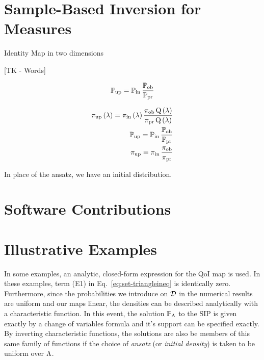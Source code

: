 \pagebreak
\section{Sample-Based Inversion for Measures}\label{sec:ch02-sample}




Identity Map in two dimensions


[TK - Words]

\begin{equation}
\operatorname*{\mathbb{P}_{up}} = \operatorname*{\mathbb{P}_{in}} \frac{\operatorname*{\mathbb{P}_{ob}}}{\operatorname*{\mathbb{P}_{pr}}}
\end{equation}

\begin{equation}
\begin{split}
\operatorname*{\operatorname*{\pi_{up}}\left ( \lambda \right ) = \operatorname*{\pi_{in}}\left ( \lambda \right ) \frac{\operatorname*{\pi_{ob}}Q\left ( \lambda \right )}{\operatorname*{\pi_{pr}}Q\left ( \lambda \right )}}\\
\operatorname*{\operatorname*{\mathbb{P}_{up}} = \operatorname*{\mathbb{P}_{in}} \frac{\operatorname*{\mathbb{P}_{ob}}}{\operatorname*{\mathbb{P}_{pr}}}}\\
\operatorname*{\operatorname*{\pi_{up}} = \operatorname*{\pi_{in}} \frac{\operatorname*{\pi_{ob}}}{\operatorname*{\pi_{pr}}}}
\end{split}
\end{equation}

In place of the ansatz, we have an initial distribution.



\section{Software Contributions}\label{sec:ch02-software}



\section{Illustrative Examples}\label{sec:ch02-examples}
In some examples, an analytic, closed-form expression for the QoI map is used.
In these examples, term (E1) in Eq.~\eqref{eq:set-triangleineq} is identically zero.
Furthermore, since the probabilities we introduce on $\mathcal{D}$ in the numerical results are uniform and our maps linear, the densities can be described analytically with a characteristic function.
In this event, the solution $\mathbb{P}_{\Lambda}$ to the SIP is given exactly by a change of variables formula and it's support can be specified exactly.
By inverting characteristic functions, the solutions are also be members of this same family of functions if the choice of \emph{ansatz} (or \emph{initial density}) is taken to be uniform over ${\Lambda}$.

